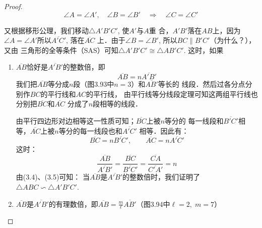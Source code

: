 \begin{proof}
\begin{equation}
    \angle A=\angle A',\quad \angle B=\angle B' \quad \Rightarrow\quad \angle C=\angle C'
\end{equation}
    
又根据移形公理，我们移动$\triangle A'B'C'$, 使$A'$与$A$重
合，$A'B'$落在$AB$上，因为$\angle A=\angle A'$所以$\overline{A'C'}$, 落在$\overline{AC}$
上．由于$\angle B=\angle B'$, 所以$BC\parallel B'C'$（为什么？），又由
三角形的全等条件（SAS）可知$\triangle A'B'C'\cong \triangle AB'C'$.
这时，如果

\begin{enumerate}
    \item $\overline{AB}$恰好是$\overline{A'B'}$的整数倍，即
\[\overline{AB}=n\overline{A'B'}\]
我们把$\overline{AB}$等分成$n$段（图3.93中$n=3$）和$\overline{AB'}$等长的
线段．然后过各分点分别作$BC$的平行线和$AC$的平行线，
由平行线等分线段定理可知这两组平行线也分别把$\overline{BC}$和$\overline{AC}$
分成了$n$段相等的线段．

由平行四边形对边相等这一性质可知；$\overline{BC}$上被$n$等分的
每一线段和$\overline{B'C'}$相等，$\overline{AC}$上被$n$等分的每一线段也和$\overline{A'C'}$
相等．因此有：
\[\overline{BC}=n\overline{B'C'},\qquad \overline{AC}=n\overline{A'C'}\]
这时：
\begin{equation}
    \frac{\overline{AB}}{\overline{A'B'}}=\frac{\overline{BC}}{\overline{B'C'}}=\frac{\overline{CA}}{\overline{C'A'}}=n
\end{equation}
由(3.4)、(3.5)可知：
当$\overline{AB}$是$\overline{A'B'}$的整数倍时，我们证明了
$\triangle ABC\backsim \triangle A'B'C'$.
\item $\overline{AB}$是$\overline{A'B'}$的有理数倍，即$\overline{AB}=\frac{m}{\ell}\overline{AB'}$（图3.94中$\ell=2,\; m=7$）

\begin{figure}[htp]
    \centering
{}
    \caption{}
\end{figure}



\end{enumerate}
\end{proof}
